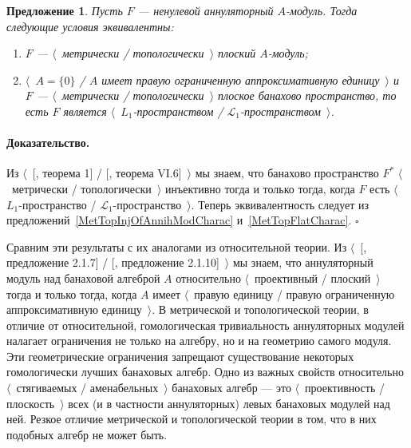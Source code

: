 \documentclass[12pt]{article}
\newtheorem{proposition}[theorem]{Предложение}
\renewenvironment{proof}{\paragraph{Доказательство.}}{\hfill$\square$\medskip}
\begin{document}
\begin{proposition}\label{MetTopFlatAnnihModCharac} Пусть $F$ --- ненулевой
    аннуляторный $A$-модуль. Тогда следующие условия эквивалентны:
    \begin{enumerate}[label = (\roman*)]
        \item $F$ --- $\langle$~метрически / топологически~$\rangle$ плоский
              $A$-модуль;

        \item $\langle$~$A= \{0 \}$ / $A$ имеет правую ограниченную
              аппроксимативную единицу~$\rangle$ и 
              $F$ --- $\langle$~метрически / топологически~$\rangle$ 
              плоское банахово пространство, то есть $F$ является
              $\langle$~$L_1$-пространством / 
              $\mathscr{L}_1$-пространством~$\rangle$.
    \end{enumerate}

\end{proposition}
\begin{proof} Из $\langle$~[\cite{GrothMetrProjFlatBanSp}, теорема 1] /
    [\cite{StegRethNucOpL1LInfSp}, теорема VI.6]~$\rangle$ мы знаем, что
    банахово пространство $F^*$ $\langle$~метрически / топологически~$\rangle$
    инъективно тогда и только тогда, когда $F$ есть $\langle$~$L_1$-пространство
    / $\mathscr{L}_1$-пространство~$\rangle$. Теперь эквивалентность следует из
    предложений~\ref{MetTopInjOfAnnihModCharac} и~\ref{MetTopFlatCharac}.
\end{proof}

Сравним эти результаты с их аналогами из относительной теории. Из
$\langle$~[\cite{RamsHomPropSemgroupAlg}, предложение 2.1.7] /
[\cite{RamsHomPropSemgroupAlg}, предложение 2.1.10]~$\rangle$ мы знаем, что
аннуляторный модуль над банаховой алгеброй $A$  относительно
$\langle$~проективный / плоский~$\rangle$ тогда и только тогда, когда $A$ имеет
$\langle$~правую единицу / правую ограниченную аппроксимативную
единицу~$\rangle$. В метрической и топологической теории, в отличие от
относительной, гомологическая тривиальность аннуляторных модулей налагает
ограничения не только на алгебру, но и на геометрию самого модуля. Эти
геометрические ограничения запрещают существование некоторых гомологически
лучших банаховых алгебр. Одно из важных свойств относительно
$\langle$~стягиваемых / аменабельных~$\rangle$ банаховых алгебр --- это
$\langle$~проективность / плоскость~$\rangle$ всех (и в частности аннуляторных)
левых банаховых модулей над ней. Резкое отличие метрической и топологической
теории в том, что в них подобных алгебр не может быть.
\end{document}
